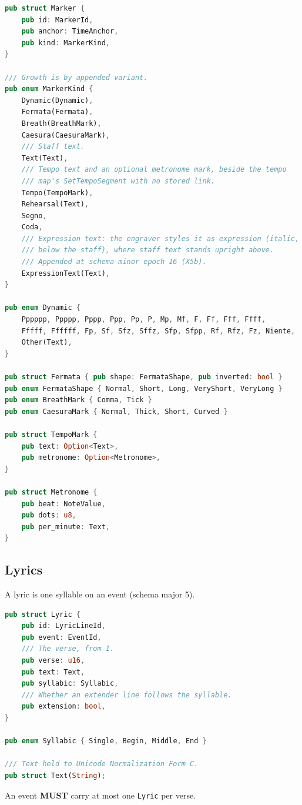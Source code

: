 \documentclass[11pt,letterpaper]{report}
\newcounter{requirement}[chapter]
\newcommand{\MUST}{\textbf{MUST}}
\begin{document}
\begin{lstlisting}[language=Rust]
pub struct Marker {
    pub id: MarkerId,
    pub anchor: TimeAnchor,
    pub kind: MarkerKind,
}

/// Growth is by appended variant.
pub enum MarkerKind {
    Dynamic(Dynamic),
    Fermata(Fermata),
    Breath(BreathMark),
    Caesura(CaesuraMark),
    /// Staff text.
    Text(Text),
    /// Tempo text and an optional metronome mark, beside the tempo
    /// map's SetTempoSegment with no stored link.
    Tempo(TempoMark),
    Rehearsal(Text),
    Segno,
    Coda,
    /// Expression text: the engraver styles it as expression (italic,
    /// below the staff), where staff text stands upright above.
    /// Appended at schema-minor epoch 16 (X5b).
    ExpressionText(Text),
}

pub enum Dynamic {
    Pppppp, Ppppp, Pppp, Ppp, Pp, P, Mp, Mf, F, Ff, Fff, Ffff,
    Fffff, Ffffff, Fp, Sf, Sfz, Sffz, Sfp, Sfpp, Rf, Rfz, Fz, Niente,
    Other(Text),
}

pub struct Fermata { pub shape: FermataShape, pub inverted: bool }
pub enum FermataShape { Normal, Short, Long, VeryShort, VeryLong }
pub enum BreathMark { Comma, Tick }
pub enum CaesuraMark { Normal, Thick, Short, Curved }

pub struct TempoMark {
    pub text: Option<Text>,
    pub metronome: Option<Metronome>,
}

pub struct Metronome {
    pub beat: NoteValue,
    pub dots: u8,
    pub per_minute: Text,
}
\end{lstlisting}

\subsection{Lyrics}

A lyric is one syllable on an event (schema major 5).

\begin{lstlisting}[language=Rust]
pub struct Lyric {
    pub id: LyricLineId,
    pub event: EventId,
    /// The verse, from 1.
    pub verse: u16,
    pub text: Text,
    pub syllabic: Syllabic,
    /// Whether an extender line follows the syllable.
    pub extension: bool,
}

pub enum Syllabic { Single, Begin, Middle, End }

/// Text held to Unicode Normalization Form C.
pub struct Text(String);
\end{lstlisting}

\begin{requirement}
  \label{req:graph:lyric-syllable}
  An event \MUST{} carry at most one \texttt{Lyric} per verse.
\end{requirement}
\end{document}
